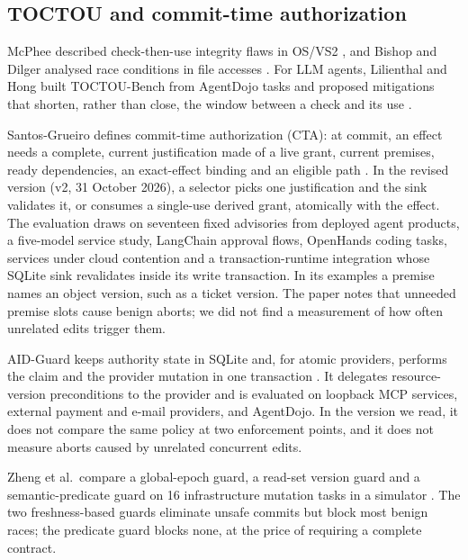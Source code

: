 \subsection{TOCTOU and commit-time authorization}
McPhee described check-then-use integrity flaws in OS/VS2 \cite{mcphee1974}, and Bishop and Dilger analysed race conditions in file accesses \cite{bishop1996}. For LLM agents, Lilienthal and Hong built TOCTOU-Bench from AgentDojo tasks and proposed mitigations that shorten, rather than close, the window between a check and its use \cite{mindthegap2025}.

Santos-Grueiro defines commit-time authorization (CTA): at commit, an effect needs a complete, current justification made of a live grant, current premises, ready dependencies, an exact-effect binding and an eligible path \cite{santosgrueiro2026}. In the revised version (v2, 31 October 2026), a selector picks one justification and the sink validates it, or consumes a single-use derived grant, atomically with the effect. The evaluation draws on seventeen fixed advisories from deployed agent products, a five-model service study, LangChain approval flows, OpenHands coding tasks, services under cloud contention and a transaction-runtime integration whose SQLite sink revalidates inside its write transaction. In its examples a premise names an object version, such as a ticket version. The paper notes that unneeded premise slots cause benign aborts; we did not find a measurement of how often unrelated edits trigger them.

AID-Guard keeps authority state in SQLite and, for atomic providers, performs the claim and the provider mutation in one transaction \cite{aidguard2026}. It delegates resource-version preconditions to the provider and is evaluated on loopback MCP services, external payment and e-mail providers, and AgentDojo. In the version we read, it does not compare the same policy at two enforcement points, and it does not measure aborts caused by unrelated concurrent edits.

Zheng et al.\ compare a global-epoch guard, a read-set version guard and a semantic-predicate guard on 16 infrastructure mutation tasks in a simulator \cite{zheng2026stale}. The two freshness-based guards eliminate unsafe commits but block most benign races; the predicate guard blocks none, at the price of requiring a complete contract.

